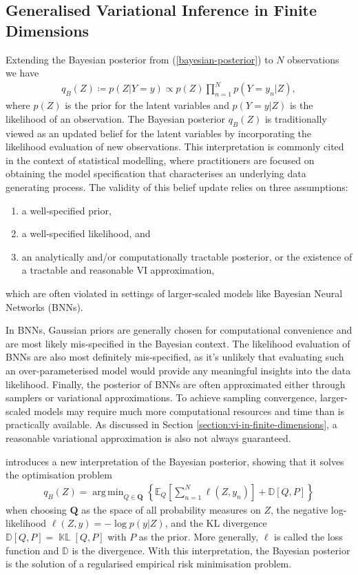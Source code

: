 \documentclass{article}
\newcommand{\KLD}{\operatorname{\mathbb{KL}}}
\DeclareMathOperator*{\argmin}{arg\,min}
\numberwithin{equation}{section}
\begin{document}
\subsection{Generalised Variational Inference in Finite Dimensions}
Extending the Bayesian posterior from (\ref{bayesian-posterior}) to $N$ observations we have
\begin{align}
    \label{bayesian-posterior-gvi}
    q_B(Z) \coloneqq p(Z\vert Y=y) \propto p(Z) \prod_{n=1}^N p(Y=y_n \vert Z),
\end{align}
where $p(Z)$ is the prior for the latent variables and $p(Y=y \vert Z)$ is the likelihood of an observation.
The Bayesian posterior $q_B(Z)$ is traditionally viewed as an updated belief for the latent variables by incorporating the likelihood evaluation of new observations.
This interpretation is commonly cited in the context of statistical modelling, where practitioners are focused on obtaining the model specification that characterises an underlying data generating process. 
The validity of this belief update relies on three assumptions:
\begin{enumerate}
    \setlength\itemsep{-0.25em}
    \item a well-specified prior,
    \item a well-specified likelihood, and
    \item an analytically and/or computationally tractable posterior, or the existence of a tractable and reasonable VI approximation,
\end{enumerate}
which are often violated in settings of larger-scaled models like Bayesian Neural Networks (BNNs).

In BNNs, Gaussian priors are generally chosen for computational convenience and are most likely mis-specified in the Bayesian context.
The likelihood evaluation of BNNs are also most definitely mis-specified, as it's unlikely that evaluating such an over-parameterised model would provide any meaningful insights into the data likelihood.
Finally, the posterior of BNNs are often approximated either through samplers or variational approximations.
To achieve sampling convergence, larger-scaled models may require much more computational resources and time than is practically available.
As discussed in Section \ref{section:vi-in-finite-dimensions}, a reasonable variational approximation is also not always guaranteed.

\cite{knoblauch2022optimization} introduces a new interpretation of the Bayesian posterior, showing that it solves the optimisation problem
\begin{align}
    q_B(Z) = \argmin_{Q \in \boldsymbol{Q}} \left\{\mathbb{E}_{Q}\left[\sum_{n=1}^N \ell \left(Z, y_n\right)\right] + \mathbb{D}\left[Q, P\right]\right\}
    \label{gvi-posterior}
\end{align}
when choosing $\boldsymbol{Q}$ as the space of all probability measures on $Z$, the negative log-likelihood $\ell(Z, y) =-\log p\left(y \vert Z\right)$,  and the KL divergence $\mathbb{D}\left[Q, P\right] = \KLD\left[Q, P\right]$ with $P$ as the prior.
More generally, $\ell$ is called the loss function and $\mathbb{D}$ is the divergence. With this interpretation, the Bayesian posterior is the solution of a regularised empirical risk minimisation problem.
\end{document}

